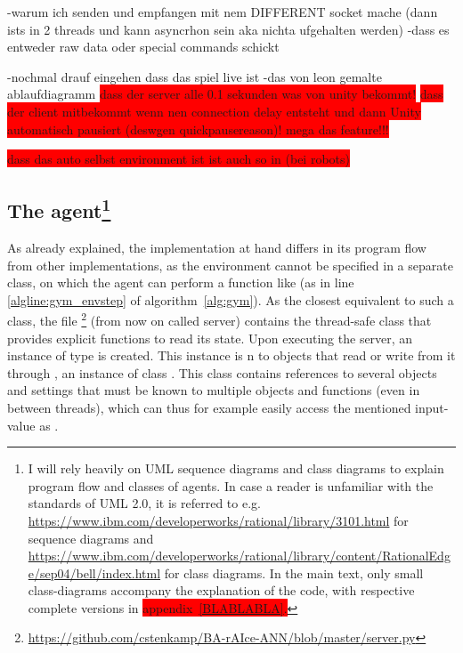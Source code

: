 
-warum ich senden und empfangen mit nem DIFFERENT socket mache (dann ists in 2 threads und kann asyncrhon sein aka nichta ufgehalten werden)
-dass es entweder raw data oder special commands schickt

-nochmal drauf eingehen dass das spiel live ist
-das von leon gemalte ablaufdiagramm
\colorbox{red}{dass der server alle 0.1 sekunden was von unity bekommt!}
\colorbox{red}{dass der client mitbekommt wenn nen connection delay entsteht und dann 
	Unity automatisch pausiert (deswgen quickpausereason)! mega das feature!!!}

\colorbox{red}{dass das auto selbst environment ist ist auch so in \cite{wawrzynski_control_2015} (bei robots)}

\subsection{The agent\footnote{I will rely heavily on UML sequence diagrams and class diagrams to explain program flow and classes of agents. In case a reader is unfamiliar with the standards of UML 2.0, it is referred to e.g. \url{https://www.ibm.com/developerworks/rational/library/3101.html} for sequence diagrams and \url{https://www.ibm.com/developerworks/rational/library/content/RationalEdge/sep04/bell/index.html} for class diagrams. In the main text, only small class-diagrams accompany the explanation of the code, with respective complete versions in  \colorbox{red}{appendix~\ref{BLABLABLA}.}}}

As already explained, the implementation at hand differs in its program flow from other implementations, as the environment cannot be specified in a separate class, on which the agent can perform a function like  (as in line \ref{algline:gym_envstep} of algorithm~\ref{alg:gym}). As the closest equivalent to such a class, the file  \footnote{\url{https://github.com/cstenkamp/BA-rAIce-ANN/blob/master/server.py}} (from now on called server) contains the thread-safe class  that provides explicit functions to read its state. Upon executing the server, an instance  of type  is created. This instance is n to objects that read or write from it through , an instance of class . This class contains references to several objects and settings that must be known to multiple objects and functions (even in between threads), which can thus for example easily access the mentioned input-value as .

